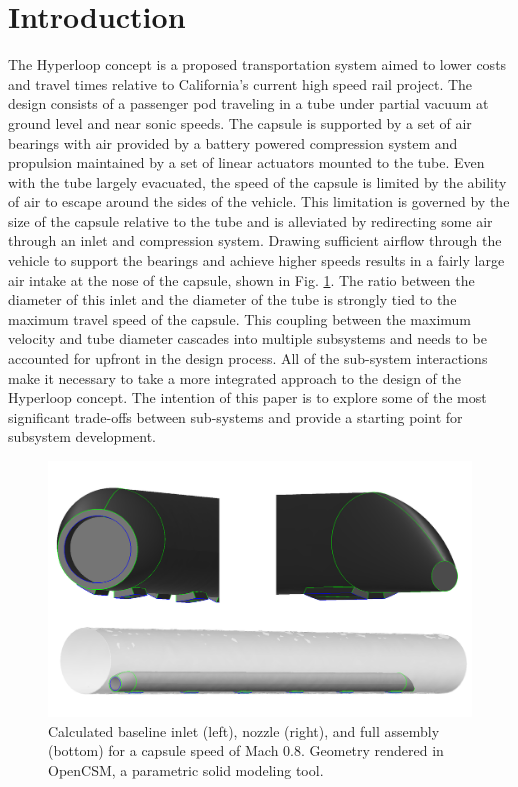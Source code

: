 \documentclass[heading.tex]{subfiles}
\begin{document}
\section{Introduction}

The Hyperloop concept is a proposed transportation system aimed to lower costs and travel times relative to California's current high speed
 rail project. \cite{Musk} The design consists of a passenger pod traveling in a tube under partial vacuum at ground level and near sonic
speeds. The capsule is supported by a set of air bearings with air provided by a battery powered compression system and propulsion maintained
by a set of linear actuators mounted to the tube. Even with the tube largely evacuated, the speed of the capsule is limited by the ability of air to
escape around the sides of the vehicle. This limitation is governed by the size of the capsule relative to the tube and is alleviated by redirecting some air
through an inlet and compression system. Drawing sufficient airflow through the vehicle to support the bearings and achieve higher speeds results
in a fairly large air intake at the nose of the capsule, shown in Fig. \ref{f:hyperloopCAD}. The ratio between the diameter of this inlet and the diameter of the
tube is strongly tied to the maximum travel speed of the capsule. This coupling between the maximum velocity and
tube diameter cascades into multiple subsystems and needs to be accounted for upfront in the design process. 
All of the sub-system interactions make it necessary to take a more integrated approach to the design of the Hyperloop concept. The intention of
this paper is to explore some of the most significant trade-offs between sub-systems and provide a starting point for subsystem development.

\begin{figure}[hbtp]
\centering
\includegraphics[width=\textwidth]{images/hyperloop_cad.png}
 \caption[Hyperloop geometry assembled in OpenCSM]{Calculated baseline inlet (left), nozzle (right), and full assembly (bottom) for a capsule speed of Mach 0.8. Geometry rendered in OpenCSM, a parametric solid modeling tool.}
\label{f:hyperloopCAD}
\end{figure}
\end{document}
